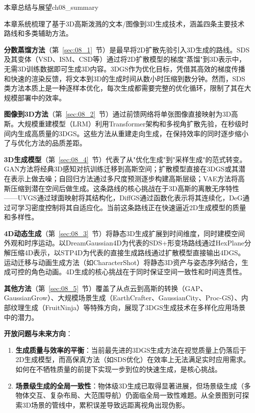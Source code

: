 \begin{futurebox}{本章总结与展望}{ch08_summary}

本章系统梳理了基于3D高斯泼溅的文本/图像到3D生成技术，涵盖四条主要技术路线和多类辅助方法。

\textbf{分数蒸馏方法}（第~\ref{sec:08_1}~节）是最早将2D扩散先验引入3D生成的路线。SDS及其变体（VSD、ISM、CSD等）通过将2D扩散模型的梯度"蒸馏"到3D表示中，无需3D训练数据即可生成3D内容。3DGS作为优化目标，凭借其高效的梯度传播和快速的渲染反馈，将文本到3D的生成时间从数小时压缩到数分钟。然而，SDS类方法本质上是一种逐样本优化，每次生成都需要完整的优化循环，限制了其在大规模部署中的效率。

\textbf{图像到3D方法}（第~\ref{sec:08_2}~节）通过前馈网络将单张图像直接映射为3D高斯。大规模重建模型（LRM）利用Transformer架构和多视角扩散先验，在秒级时间内生成高质量的3DGS。这些方法从重建走向生成，在保持效率的同时逐步缩小了与优化方法的品质差距。

\textbf{3D生成模型}（第~\ref{sec:08_4}~节）代表了从"优化生成"到"采样生成"的范式转变。GAN方法将经典3D感知对抗训练迁移到高斯空间；扩散模型直接在3DGS或其潜在表示上做去噪；自回归方法通过多尺度预测逐步构建高斯层级；VAE方法将高斯压缩到潜在空间后做生成。这条路线的核心挑战在于3D高斯的离散无序特性——UVGS通过球面映射将其结构化，DiffGS通过函数化表示将其连续化，DeG通过可学习密度控制将其自适应化。当前这条路线正在快速逼近2D生成模型的质量和多样性。

\textbf{4D动态生成}（第~\ref{sec:08_3}~节）将静态3D生成扩展到时间维度，同时建模空间外观和时序运动。以DreamGaussian4D为代表的SDS+形变场路线通过HexPlane分解压缩4D表示，以STP4D为代表的直接生成路线通过扩散模型直接输出4DGS。运动迁移与动画生成方法（如CharacterShot）将静态3D资产与姿态序列结合，生成可控的角色动画。4D生成的核心挑战在于同时保证空间一致性和时间连贯性。

\textbf{其他方法}（第~\ref{sec:08_5}~节）覆盖了从点云到高斯的转换（GAP、GaussianGrow）、大规模场景生成（EarthCrafter、GaussianCity、Proc-GS）、内部纹理生成（FruitNinja）等特殊方向，展现了3DGS生成技术在多样化应用场景中的潜力。

\textbf{开放问题与未来方向}：

\begin{enumerate}
\item \textbf{生成质量与效率的平衡}：当前最先进的3DGS生成方法在视觉质量上仍落后于2D生成模型，而高保真方法（如SDS优化）在效率上无法满足实时应用需求。如何在不牺牲质量的前提下实现一步到位的快速生成，是核心挑战。

\item \textbf{场景级生成的全局一致性}：物体级3D生成已取得显著进展，但场景级生成（多物体交互、复杂布局、大范围导航）仍面临全局一致性难题。从全景图到可探索3D场景的管线中，累积误差导致远距离视角出现伪影。


\end{enumerate}
\end{futurebox}
